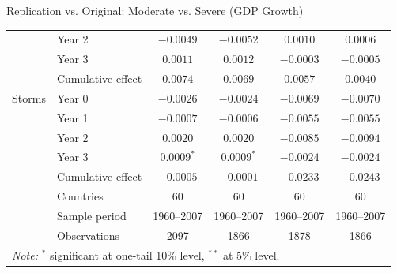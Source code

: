 \documentclass[10pt, aspectratio=169]{beamer}
\begin{document}
\begin{frame}{Replication vs. Original: Moderate vs. Severe (GDP Growth)}
\begin{table}
{\begin{tabular}{llcccc}
                        & Year 2            & $-0.0049$      & $-0.0052$      & $0.0010$       & $0.0006$ \\
                        & Year 3            & $0.0011$       & $0.0012$       & $-0.0003$      & $-0.0005$ \\
                        & Cumulative effect & $0.0074$       & $0.0069$       & $0.0057$       & $0.0040$ \\
            [0.5ex]
            Storms      & Year 0            & $-0.0026$      & $-0.0024$      & $-0.0069$      & $-0.0070$ \\
                        & Year 1            & $-0.0007$      & $-0.0006$      & $-0.0055$      & $-0.0055$ \\
                        & Year 2            & $0.0020$       & $0.0020$       & $-0.0085$      & $-0.0094$ \\
                        & Year 3            & $0.0009^{*}$   & $0.0009^{*}$   & $-0.0024$      & $-0.0024$ \\
                        & Cumulative effect & $-0.0005$      & $-0.0001$      & $-0.0233$      & $-0.0243$ \\
            \midrule
                        & Countries         & 60         & 60         & 60         & 60 \\
                        & Sample period     & 1960--2007 & 1960--2007 & 1960--2007 & 1960--2007 \\
                        & Observations      & 2097       & 1866       & 1878       & 1866 \\
            \bottomrule
            \multicolumn{6}{l}{\scriptsize \textit{Note:} $^{*}$ significant at one-tail 10\% level, $^{**}$ at 5\% level.}
        \end{tabular}
        }
    \end{table}
\end{frame}
\end{document}
